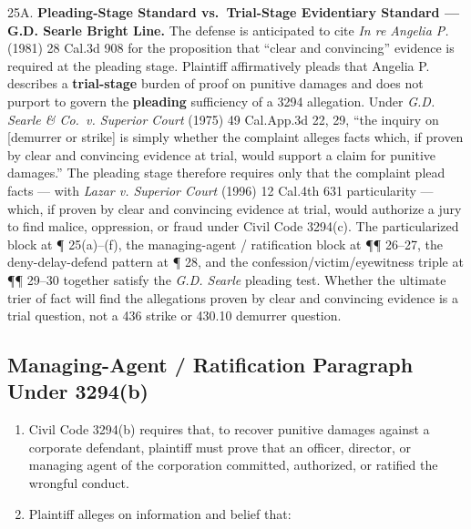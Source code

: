 25A. \textbf{Pleading-Stage Standard vs.~Trial-Stage Evidentiary Standard --- G.D. Searle Bright Line.} The defense is anticipated to cite \emph{In re Angelia P.} (1981) 28 Cal.3d 908 for the proposition that ``clear and convincing'' evidence is required at the pleading stage. Plaintiff affirmatively pleads that Angelia P. describes a \textbf{trial-stage} burden of proof on punitive damages and does not purport to govern the \textbf{pleading} sufficiency of a \textsection{} 3294 allegation. Under \emph{G.D. Searle \& Co.~v. Superior Court} (1975) 49 Cal.App.3d 22, 29, ``the inquiry on {[}demurrer or strike{]} is simply whether the complaint alleges facts which, if proven by clear and convincing evidence at trial, would support a claim for punitive damages.'' The pleading stage therefore requires only that the complaint plead facts --- with \emph{Lazar v. Superior Court} (1996) 12 Cal.4th 631 particularity --- which, if proven by clear and convincing evidence at trial, would authorize a jury to find malice, oppression, or fraud under Civil Code \textsection{} 3294(c). The particularized block at ¶ 25(a)--(f), the managing-agent / ratification block at ¶¶ 26--27, the deny-delay-defend pattern at ¶ 28, and the confession/victim/eyewitness triple at ¶¶ 29--30 together satisfy the \emph{G.D. Searle} pleading test. Whether the ultimate trier of fact will find the allegations proven by clear and convincing evidence is a trial question, not a \textsection{} 436 strike or \textsection{} 430.10 demurrer question.

\subsection{Managing-Agent / Ratification Paragraph Under \textsection{} 3294(b)}\label{managing-agent-ratification-paragraph-under-3294b}

\begin{enumerate}
\def\labelenumi{\arabic{enumi}.}
\setcounter{enumi}{25}
\item
  Civil Code \textsection{} 3294(b) requires that, to recover punitive damages against a corporate defendant, plaintiff must prove that an officer, director, or managing agent of the corporation committed, authorized, or ratified the wrongful conduct.
\item
  Plaintiff alleges on information and belief that:
\end{enumerate}

